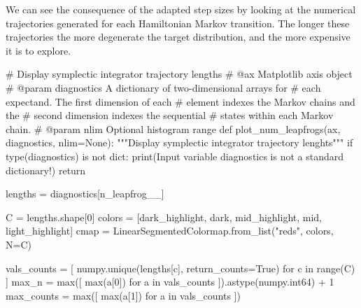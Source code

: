 \documentclass[
  letterpaper,
  DIV=11,
  numbers=noendperiod]{scrartcl}
\newenvironment{Shaded}{\begin{snugshade}}{\end{snugshade}}
\newcommand{\BuiltInTok}[1]{\textcolor[rgb]{0.00,0.23,0.31}{#1}}
\newcommand{\CommentTok}[1]{\textcolor[rgb]{0.37,0.37,0.37}{#1}}
\newcommand{\ControlFlowTok}[1]{\textcolor[rgb]{0.00,0.23,0.31}{#1}}
\newcommand{\DecValTok}[1]{\textcolor[rgb]{0.68,0.00,0.00}{#1}}
\newcommand{\KeywordTok}[1]{\textcolor[rgb]{0.00,0.23,0.31}{#1}}
\newcommand{\NormalTok}[1]{\textcolor[rgb]{0.00,0.23,0.31}{#1}}
\newcommand{\OperatorTok}[1]{\textcolor[rgb]{0.37,0.37,0.37}{#1}}
\newcommand{\StringTok}[1]{\textcolor[rgb]{0.13,0.47,0.30}{#1}}
\newcommand{\VariableTok}[1]{\textcolor[rgb]{0.07,0.07,0.07}{#1}}
\begin{document}
We can see the consequence of the adapted step sizes by looking at the
numerical trajectories generated for each Hamiltonian Markov transition.
The longer these trajectories the more degenerate the target
distribution, and the more expensive it is to explore.

\begin{Shaded}
\begin{Highlighting}[]
\CommentTok{\# Display symplectic integrator trajectory lengths}
\CommentTok{\# @ax Matplotlib axis object}
\CommentTok{\# @param diagnostics A dictionary of two{-}dimensional arrays for }
\CommentTok{\#                    each expectand.  The first dimension of each}
\CommentTok{\#                    element indexes the Markov chains and the }
\CommentTok{\#                    second dimension indexes the sequential }
\CommentTok{\#                    states within each Markov chain.}
\CommentTok{\# @param nlim Optional histogram range}
\KeywordTok{def}\NormalTok{ plot\_num\_leapfrogs(ax, diagnostics, nlim}\OperatorTok{=}\VariableTok{None}\NormalTok{):}
  \CommentTok{"""Display symplectic integrator trajectory lenghts"""}
  \ControlFlowTok{if} \BuiltInTok{type}\NormalTok{(diagnostics) }\KeywordTok{is} \KeywordTok{not} \BuiltInTok{dict}\NormalTok{:}
    \BuiltInTok{print}\NormalTok{(}\StringTok{\textquotesingle{}Input variable \textasciigrave{}diagnostics\textasciigrave{} is not a standard dictionary!\textquotesingle{}}\NormalTok{)}
    \ControlFlowTok{return}
  
\NormalTok{  lengths }\OperatorTok{=}\NormalTok{ diagnostics[}\StringTok{\textquotesingle{}n\_leapfrog\_\_\textquotesingle{}}\NormalTok{]}
  
\NormalTok{  C }\OperatorTok{=}\NormalTok{ lengths.shape[}\DecValTok{0}\NormalTok{]}
\NormalTok{  colors }\OperatorTok{=}\NormalTok{ [dark\_highlight, dark, mid\_highlight, mid, light\_highlight]}
\NormalTok{  cmap }\OperatorTok{=}\NormalTok{ LinearSegmentedColormap.from\_list(}\StringTok{"reds"}\NormalTok{, colors, N}\OperatorTok{=}\NormalTok{C)}
  
\NormalTok{  vals\_counts }\OperatorTok{=}\NormalTok{ [ numpy.unique(lengths[c], return\_counts}\OperatorTok{=}\VariableTok{True}\NormalTok{) }
                  \ControlFlowTok{for}\NormalTok{ c }\KeywordTok{in} \BuiltInTok{range}\NormalTok{(C) ] }
\NormalTok{  max\_n }\OperatorTok{=} \BuiltInTok{max}\NormalTok{([ }\BuiltInTok{max}\NormalTok{(a[}\DecValTok{0}\NormalTok{]) }\ControlFlowTok{for}\NormalTok{ a }\KeywordTok{in}\NormalTok{ vals\_counts ]).astype(numpy.int64) }\OperatorTok{+} \DecValTok{1}
\NormalTok{  max\_counts }\OperatorTok{=} \BuiltInTok{max}\NormalTok{([ }\BuiltInTok{max}\NormalTok{(a[}\DecValTok{1}\NormalTok{]) }\ControlFlowTok{for}\NormalTok{ a }\KeywordTok{in}\NormalTok{ vals\_counts ])}
  

\end{Highlighting}
\end{Shaded}
\end{document}
